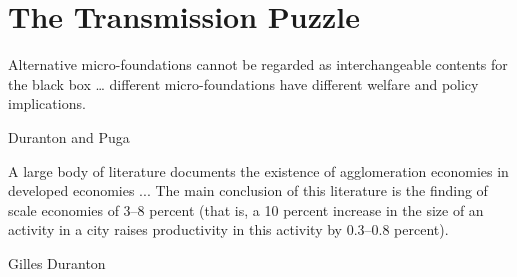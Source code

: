 \chapter{The Transmission Puzzle} \label{chapter-tramsmission}%



\epigraph{Alternative micro-foundations cannot be regarded as interchangeable contents for the black box \dots %
different micro-foundations have different welfare and policy implications. %
}{Duranton and Puga \cite{durantonMicroFoundationsUrbanAgglomeration2004}}

\epigraph{A large body of literature documents the existence of agglomeration economies in developed economies ... The main conclusion of this literature is the finding of scale economies of 3--8 percent (that is, a 10 percent increase in the size of an activity in a city raises productivity in this activity by 0.3--0.8 percent).}{Gilles Duranton \cite{durantonAreCitiesEngines2009}} %

